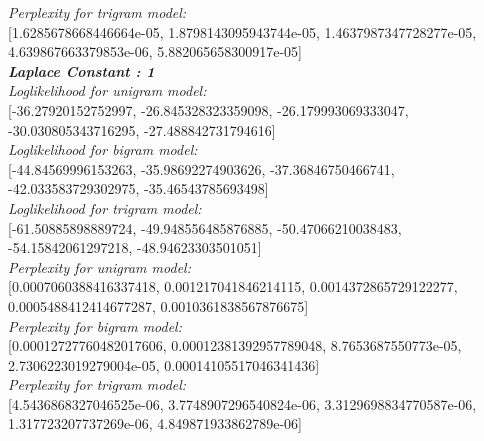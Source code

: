 \documentclass[11ppt]{article}
\begin{document}
\textit{Perplexity for trigram model:} \\ \vspace{1mm}  [1.6285678668446664e-05, 1.8798143095943744e-05, 1.4637987347728277e-05, 4.639867663379853e-06, 5.882065658300917e-05]  \\ \vspace{2mm}
\textit{\textbf{Laplace Constant : 1 }}\\ \vspace{2mm}
\textit{Loglikelihood for unigram model:} \\ \vspace{1mm}  [-36.27920152752997, -26.845328323359098, -26.179993069333047, -30.030805343716295, -27.488842731794616]  \\ \vspace{2mm}
\textit{Loglikelihood for bigram model:} \\ \vspace{1mm}  [-44.84569996153263, -35.98692274903626, -37.36846750466741, -42.033583729302975, -35.46543785693498]  \\ \vspace{2mm}
\textit{Loglikelihood for trigram model:} \\ \vspace{1mm}  [-61.50885898889724, -49.948556485876885, -50.47066210038483, -54.15842061297218, -48.94623303501051]  \\ \vspace{2mm}
\textit{Perplexity for unigram model:} \\ \vspace{1mm}  [0.0007060388416337418, 0.001217041846214115, 0.0014372865729122277, 0.0005488412414677287, 0.0010361838567876675]  \\ \vspace{2mm}
\textit{Perplexity for bigram model:} \\ \vspace{1mm}  [0.00012727760482017606, 0.00012381392957789048, 8.7653687550773e-05, 2.7306223019279004e-05, 0.00014105517046341436]  \\ \vspace{2mm}
\textit{Perplexity for trigram model:} \\ \vspace{1mm}  [4.5436868327046525e-06, 3.7748907296540824e-06, 3.3129698834770587e-06, 1.317723207737269e-06, 4.849871933862789e-06]  \\ 
\vspace{4mm}
\end{document}
